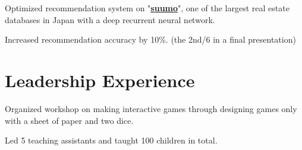 \documentclass[letterpaper]{deedy-resume} %
\begin{document}
\begin{minipage}[t]{0.66\textwidth}
%

\vspace{2mm} %

%
%

\begin{tightitemize}
\item Optimized recommendation system on "\textbf{\href{http://suumo.jp}{suumo}}", one of the largest real estate databases in Japan with a deep recurrent neural network.
\item Increased recommendation accuracy by 10\%. (the 2nd/6 in a final presentation)
\end{tightitemize}



\section{Leadership Experience}

\begin{tightitemize}
\item Organized workshop on making interactive games through designing games only with a sheet of paper and two dice.
\item Led 5 teaching assistants and taught 100 children in total.
\end{tightitemize}



\end{minipage}
\end{document}
